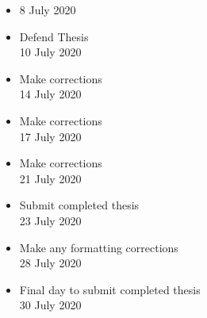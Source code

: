 \begin{itemize}
    \item 8 July 2020
    
    \item Defend Thesis\\
    10 July 2020

    \item Make corrections\\
    14 July 2020

    \item Make corrections\\
    17 July 2020

    \item Make corrections\\
    21 July 2020

    \item Submit completed thesis\\
    23 July 2020

    \item Make any formatting corrections\\
    28 July 2020

    \item Final day to submit completed thesis\\
    30 July 2020
\end{itemize}


